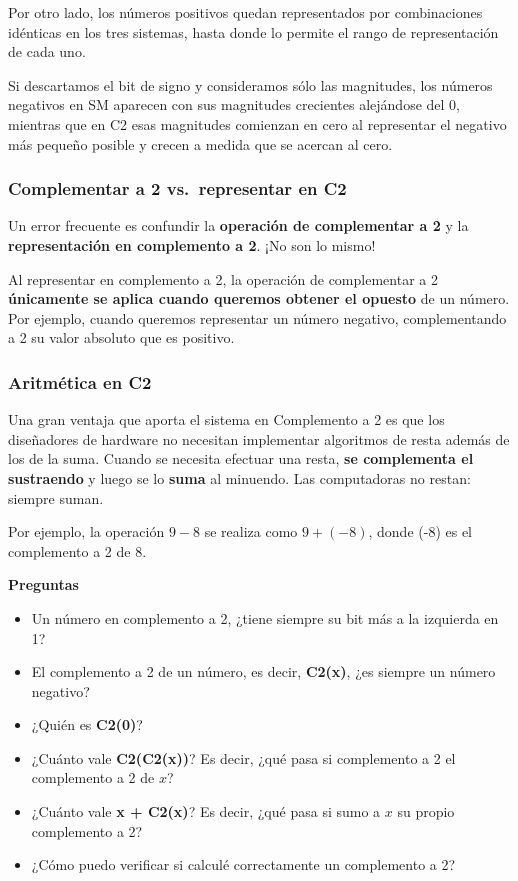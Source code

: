 \documentclass[spanish,a4paper,]{article}
\providecommand{\tightlist}{%
  \setlength{\itemsep}{0pt}\setlength{\parskip}{0pt}}
\begin{document}
Por otro lado, los números positivos quedan representados por
combinaciones idénticas en los tres sistemas, hasta donde lo permite el
rango de representación de cada uno.

Si descartamos el bit de signo y consideramos sólo las magnitudes, los
números negativos en SM aparecen con sus magnitudes crecientes
alejándose del 0, mientras que en C2 esas magnitudes comienzan en cero
al representar el negativo más pequeño posible y crecen a medida que se
acercan al cero.

\hypertarget{complementar-a-2-vs.representar-en-c2}{%
\subsubsection{Complementar a 2 vs.~representar en
C2}\label{complementar-a-2-vs.representar-en-c2}}

Un error frecuente es confundir la \textbf{operación de complementar a
2} y la \textbf{representación en complemento a 2}. ¡No son lo mismo!

Al representar en complemento a 2, la operación de complementar a 2
\textbf{únicamente se aplica cuando queremos obtener el opuesto} de un
número. Por ejemplo, cuando queremos representar un número negativo,
complementando a 2 su valor absoluto que es positivo.

\hypertarget{aritmuxe9tica-en-c2}{%
\subsubsection{Aritmética en C2}\label{aritmuxe9tica-en-c2}}

Una gran ventaja que aporta el sistema en Complemento a 2 es que los
diseñadores de hardware no necesitan implementar algoritmos de resta
además de los de la suma. Cuando se necesita efectuar una resta,
\textbf{se complementa el sustraendo} y luego se lo \textbf{suma} al
minuendo. Las computadoras no restan: siempre suman.

Por ejemplo, la operación \(9 - 8\) se realiza como \(9 + (-8)\), donde
(-8) es el complemento a 2 de 8.

\textbf{Preguntas}

\begin{itemize}
\tightlist
\item
  Un número en complemento a 2, ¿tiene siempre su bit más a la izquierda
  en 1?
\item
  El complemento a 2 de un número, es decir, \textbf{C2(x)}, ¿es siempre
  un número negativo?
\item
  ¿Quién es \textbf{C2(0)}?
\item
  ¿Cuánto vale \textbf{C2(C2(x))}? Es decir, ¿qué pasa si complemento a
  2 el complemento a 2 de \(x\)?
\item
  ¿Cuánto vale \textbf{x + C2(x)}? Es decir, ¿qué pasa si sumo a \(x\)
  su propio complemento a 2?
\item
  ¿Cómo puedo verificar si calculé correctamente un complemento a 2?
\end{itemize}
\end{document}

